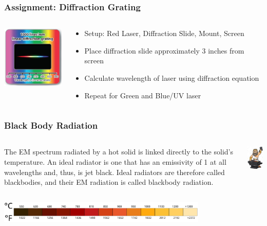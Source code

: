 \documentclass{beamer}
\begin{document}
\begin{frame}\frametitle{Assignment: Diffraction Grating}
\begin{columns}
\begin{column}{3cm}

\begin{center}
\includegraphics[width=3cm]{fig/diffslide.png}
\end{center}
\end{column}
\begin{column}{7.5cm}
\begin{itemize}
\item Setup: Red Laser, Diffraction Slide, Mount, Screen
\item Place diffraction slide approximately 3 inches from screen
\item Calculate wavelength of laser using diffraction equation
\item Repeat for Green and Blue/UV laser
\end{itemize}
\end{column}
\end{columns}
\end{frame}


\begin{frame}\frametitle{Black Body Radiation}
\begin{columns}
\begin{column}{7cm}
The EM spectrum radiated by a hot solid is linked directly to the solid’s temperature. An ideal radiator is one that has an emissivity of 1 at all wavelengths and, thus, is jet black. Ideal radiators are therefore called blackbodies, and their EM radiation is called blackbody radiation.
\end{column}
\begin{column}{4.5cm}
\begin{center}
\includegraphics[width=3cm]{fig/hephaestus.jpg}
\end{center}
\end{column}
\end{columns}

\begin{center}
\includegraphics[width=10cm]{fig/blacksmith.png}
\end{center}
\end{frame}
\end{document}
